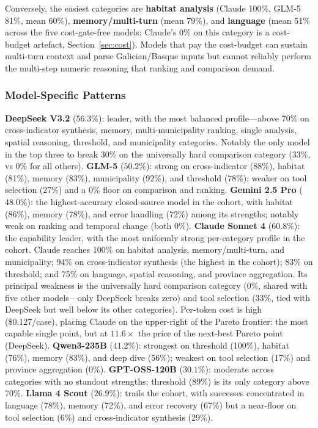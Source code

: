 \documentclass[10pt,twocolumn]{article}
\begin{document}
Conversely, the easiest categories are \textbf{habitat analysis} (Claude 100\%, GLM-5 81\%, mean 60\%), \textbf{memory/multi-turn} (mean 79\%), and \textbf{language} (mean 51\% across the five cost-gate-free models; Claude's 0\% on this category is a cost-budget artefact, Section~\ref{sec:cost}). Models that pay the cost-budget can sustain multi-turn context and parse Galician/Basque inputs but cannot reliably perform the multi-step numeric reasoning that ranking and comparison demand.

\subsubsection{Model-Specific Patterns}

\textbf{DeepSeek V3.2} ($56.3\%$): leader, with the most balanced profile---above 70\% on cross-indicator synthesis, memory, multi-municipality ranking, single analysis, spatial reasoning, threshold, and municipality categories. Notably the only model in the top three to break 30\% on the universally hard comparison category (33\%, vs 0\% for all others). \textbf{GLM-5} ($50.2\%$): strong on cross-indicator (88\%), habitat (81\%), memory (83\%), municipality (92\%), and threshold (78\%); weaker on tool selection (27\%) and a 0\% floor on comparison and ranking. \textbf{Gemini 2.5 Pro} ($48.0\%$): the highest-accuracy closed-source model in the cohort, with habitat (86\%), memory (78\%), and error handling (72\%) among its strengths; notably weak on ranking and temporal change (both 0\%). \textbf{Claude Sonnet 4} ($60.8\%$): the capability leader, with the most uniformly strong per-category profile in the cohort. Claude reaches 100\% on habitat analysis, memory/multi-turn, and municipality; 94\% on cross-indicator synthesis (the highest in the cohort); 83\% on threshold; and 75\% on language, spatial reasoning, and province aggregation. Its principal weakness is the universally hard comparison category (0\%, shared with five other models---only DeepSeek breaks zero) and tool selection (33\%, tied with DeepSeek but well below its other categories). Per-token cost is high (\$0.127/case), placing Claude on the upper-right of the Pareto frontier: the most capable single point, but at $11.6\times$ the price of the next-best Pareto point (DeepSeek). \textbf{Qwen3-235B} ($41.2\%$): strongest on threshold (100\%), habitat (76\%), memory (83\%), and deep dive (56\%); weakest on tool selection (17\%) and province aggregation (0\%). \textbf{GPT-OSS-120B} ($30.1\%$): moderate across categories with no standout strengths; threshold (89\%) is its only category above 70\%. \textbf{Llama 4 Scout} ($26.9\%$): trails the cohort, with successes concentrated in language (78\%), memory (72\%), and error recovery (67\%) but a near-floor on tool selection (6\%) and cross-indicator synthesis (29\%).
\end{document}
